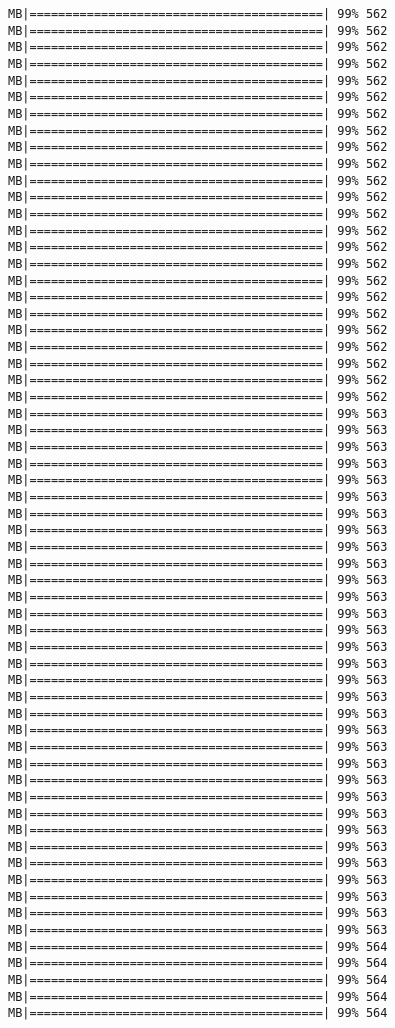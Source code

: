 \documentclass[
]{article}
\begin{document}
\begin{verbatim}
MB|=========================================| 99% 562 MB|=========================================| 99% 562 MB|=========================================| 99% 562 MB|=========================================| 99% 562 MB|=========================================| 99% 562 MB|=========================================| 99% 562 MB|=========================================| 99% 562 MB|=========================================| 99% 562 MB|=========================================| 99% 562 MB|=========================================| 99% 562 MB|=========================================| 99% 562 MB|=========================================| 99% 562 MB|=========================================| 99% 562 MB|=========================================| 99% 562 MB|=========================================| 99% 562 MB|=========================================| 99% 562 MB|=========================================| 99% 562 MB|=========================================| 99% 562 MB|=========================================| 99% 562 MB|=========================================| 99% 562 MB|=========================================| 99% 562 MB|=========================================| 99% 562 MB|=========================================| 99% 562 MB|=========================================| 99% 562 MB|=========================================| 99% 563 MB|=========================================| 99% 563 MB|=========================================| 99% 563 MB|=========================================| 99% 563 MB|=========================================| 99% 563 MB|=========================================| 99% 563 MB|=========================================| 99% 563 MB|=========================================| 99% 563 MB|=========================================| 99% 563 MB|=========================================| 99% 563 MB|=========================================| 99% 563 MB|=========================================| 99% 563 MB|=========================================| 99% 563 MB|=========================================| 99% 563 MB|=========================================| 99% 563 MB|=========================================| 99% 563 MB|=========================================| 99% 563 MB|=========================================| 99% 563 MB|=========================================| 99% 563 MB|=========================================| 99% 563 MB|=========================================| 99% 563 MB|=========================================| 99% 563 MB|=========================================| 99% 563 MB|=========================================| 99% 563 MB|=========================================| 99% 563 MB|=========================================| 99% 563 MB|=========================================| 99% 563 MB|=========================================| 99% 563 MB|=========================================| 99% 563 MB|=========================================| 99% 563 MB|=========================================| 99% 563 MB|=========================================| 99% 563 MB|=========================================| 99% 564 MB|=========================================| 99% 564 MB|=========================================| 99% 564 MB|=========================================| 99% 564 MB|=========================================| 99% 564 
\end{verbatim}
\end{document}
